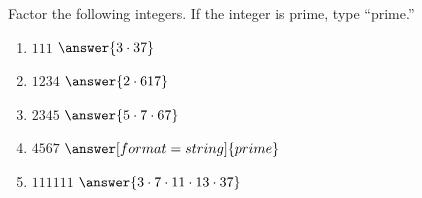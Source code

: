\documentclass[nooutcomes]{ximera}
\begin{document}

\begin{problem}
Factor the following integers.  If the integer is prime, type ``prime.''
\begin{enumerate}
\item $111$     $\answer{3\cdot 37}$
\item $1234$    $\answer{2\cdot 617}$
\item $2345$    $\answer{5\cdot 7\cdot 67}$
\item $4567$    $\answer[format=string]{prime}$
\item $111111$  $\answer{3\cdot 7\cdot 11\cdot 13 \cdot37}$
\end{enumerate}
\end{problem}

%
%
%
\end{document}
